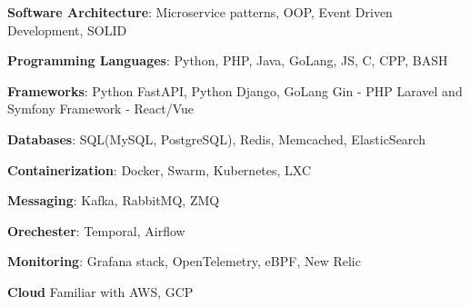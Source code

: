 \documentclass[
	10pt, %
]{FreemanCV}
\begin{document}
\begin{paracol}{2}

\begin{tightitemize}
			\vspace{2pt}
	\item{
		{\textbf{Software Architecture}: Microservice patterns, OOP, Event Driven Development, SOLID}

	}
		\vspace{2pt}
	\item{
		{\textbf{Programming Languages}: Python, PHP, Java, GoLang, JS, C, CPP, BASH}
	}
		\vspace{2pt}
	\item{
		{\textbf{Frameworks}: Python FastAPI, Python Django, GoLang Gin - PHP Laravel and Symfony Framework - React/Vue }
	}
		\vspace{2pt}
	\item{
		{\textbf{Databases}: SQL(MySQL, PostgreSQL), Redis, Memcached, ElasticSearch }
	}
		\vspace{2pt}
	\item{
		{\textbf{Containerization}: Docker, Swarm, Kubernetes, LXC }
	}
		\vspace{2pt}
	\item{
		{\textbf{Messaging}: Kafka, RabbitMQ, ZMQ}
	}
		\vspace{2pt}
\item{
	{\textbf{Orechester}: Temporal, Airflow}
}
		\vspace{2pt}
\item{
	{\textbf{Monitoring}: Grafana stack, OpenTelemetry, eBPF, New Relic}
}
	\vspace{2pt}
	\item{
		\textbf{Cloud} Familiar with AWS, GCP
	}
\end{tightitemize}



\end{paracol} %

\end{document}
